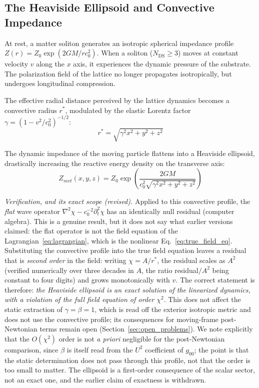 \documentclass[11pt,a4paper]{article}
\theoremstyle{plain}
\theoremstyle{remark}
\newcommand{\Ncd}{\ensuremath{N_{\mathrm{DS}}}}
\begin{document}
\subsection{The Heaviside Ellipsoid and Convective Impedance}

At rest, a matter soliton generates an isotropic spherical impedance profile $Z(r) = Z_0 \exp(2GM/rc_0^2)$. When a soliton ($\Ncd \ge 3$) moves at constant velocity $v$ along the $x$ axis, it experiences the dynamic pressure of the substrate. The polarization field of the lattice no longer propagates isotropically, but undergoes longitudinal compression.

The effective radial distance perceived by the lattice dynamics becomes a convective radius $r^*$, modulated by the elastic Lorentz factor $\gamma = (1 - v^2/c_0^2)^{-1/2}$:
\begin{equation}
r^* = \sqrt{\gamma^2 x^2 + y^2 + z^2}
\end{equation}

The dynamic impedance of the moving particle flattens into a Heaviside ellipsoid, drastically increasing the reactive energy density on the transverse axis:
\begin{equation}
Z_{mvt}(x,y,z) = Z_0 \exp\left( \frac{2GM}{c_0^2 \sqrt{\gamma^2 x^2 + y^2 + z^2}} \right)
\end{equation}

\emph{Verification, and its exact scope (revised).} Applied to this convective profile, the \emph{flat} wave operator $\nabla^2\chi - c_0^{-2}\partial_t^2\chi$ has an identically null residual (computer algebra). This is a genuine result, but it does not say what earlier versions claimed: the flat operator is not the field equation of the Lagrangian~\eqref{eq:lagrangian}, which is the nonlinear Eq.~\eqref{eq:true_field_eq}. Substituting the convective profile into the true field equation leaves a residual that is \emph{second order} in the field: writing $\chi = A/r^*$, the residual scales as $A^2$ (verified numerically over three decades in $A$, the ratio residual$/A^2$ being constant to four digits) and grows monotonically with $v$. The correct statement is therefore: \emph{the Heaviside ellipsoid is an exact solution of the linearized dynamics, with a violation of the full field equation of order $\chi^2$}. This does not affect the static extraction of $\gamma = \beta = 1$, which is read off the exterior isotropic metric and does not use the convective profile; its consequences for moving-frame post-Newtonian terms remain open (Section~\ref{sec:open_problems}). We note explicitly that the $O(\chi^2)$ order is not \emph{a priori} negligible for the post-Newtonian comparison, since $\beta$ is itself read from the $U^2$ coefficient of $g_{00}$; the point is that the static determination does not pass through this profile, not that the order is too small to matter. The ellipsoid is a first-order consequence of the scalar sector, not an exact one, and the earlier claim of exactness is withdrawn.
\end{document}
